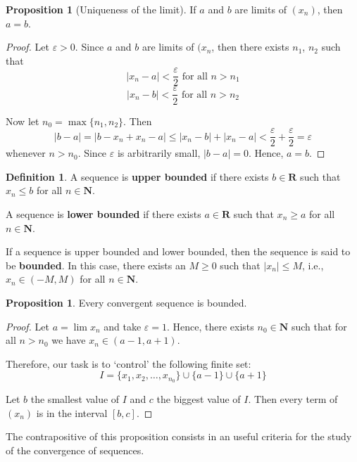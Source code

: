\documentclass[12pt,a4paper]{article}
\theoremstyle{definition}
\newtheorem{proposition}[theorem]{Proposition}
\newtheorem{definition}{Definition}[section]
\begin{document}
\begin{proposition}[Uniqueness of the limit]
	If $a$ and $b$ are limits of $(x_n)$, then $a=b$.
\end{proposition}

\begin{proof}
	Let $\varepsilon > 0$. Since $a$ and $b$ are limits of $(x_n$, then there exists $n_1$, $n_2$ such that
	\[
		| x_n - a | < \frac{\varepsilon}{2} \text{ for all } n > n_1
	\]
	\[
		| x_n - b | < \frac{\varepsilon}{2} \text{ for all } n > n_2
	\]
	
	Now let $n_0 = \max \{ n_1, n_2 \}$. Then
	\[
		| b - a | = | b - x_n + x_n - a | \leq |x_n - b| + |x_n - a| < \frac{\varepsilon}{2} + \frac{\varepsilon}{2} = \varepsilon
	\]
	whenever $n > n_0$. Since $\varepsilon$ is arbitrarily small, $|b-a| = 0$. Hence, $a = b$. 
\end{proof}

\begin{definition}
	A sequence is \textbf{upper bounded} if there exists $b \in \textbf{R}$ such that $x_n \leq b$ for all $n \in \textbf{N}$.
	
	A sequence is \textbf{lower bounded} if there exists $a \in \textbf{R}$ such that $x_n \geq a$ for all $n \in \textbf{N}$.
	
	If a sequence is upper bounded and lower bounded, then the sequence is said to be \textbf{bounded}. In this case, there exists an $M \geq 0$ such that $| x_n | \leq M$, i.e., $x_n \in (-M, M)$ for all $n \in \textbf{N}$.
\end{definition}

\begin{proposition}
	Every convergent sequence is bounded.
\end{proposition}

\begin{proof}
	Let $a = \lim x_n$ and take $\varepsilon = 1$. Hence, there exists $n_0 \in \textbf{N}$ such that for all $n > n_0$ we have $x_n \in (a-1, a+1)$. 
	
	Therefore, our task is to `control' the following finite set: \[ I = \{ x_1, x_2, \ldots, x_{n_0} \} \cup \{a-1\} \cup \{a+1\} \]
	
	Let $b$ the smallest value of $I$ and $c$ the biggest value of $I$. Then every term of $(x_n)$ is in the interval $[ b, c ]$.
\end{proof}

The contrapositive of this proposition consists in an useful criteria for the study of the convergence of sequences.
\end{document}
